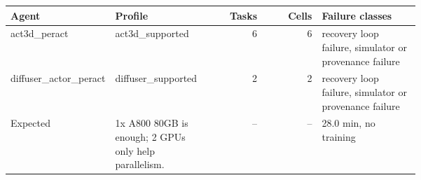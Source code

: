 \begin{tabular}{p{0.22\linewidth}p{0.22\linewidth}rrp{0.24\linewidth}}
\toprule
Agent & Profile & Tasks & Cells & Failure classes \\
\midrule
act3d\_peract & act3d\_supported & 6 & 6 & recovery loop failure, simulator or provenance failure \\
diffuser\_actor\_peract & diffuser\_supported & 2 & 2 & recovery loop failure, simulator or provenance failure \\
\midrule
Expected & 1x A800 80GB is enough; 2 GPUs only help parallelism. & -- & -- & 28.0 min, no training \\
\bottomrule
\end{tabular}

